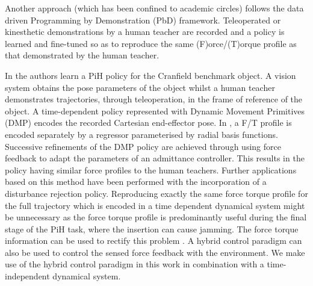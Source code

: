

Another approach (which has been confined to academic circles) follows the data driven 
Programming by Demonstration (PbD) framework. Teleoperated or kinesthetic demonstrations by a human teacher 
are recorded and a policy is learned and fine-tuned so as to reproduce the same (F)orce/(T)orque profile as 
that demonstrated by the human teacher. 

In \cite{fast_peg_pbd_icmc_2014} the authors learn a PiH policy for the Cranfield benchmark object.
A vision system obtains the pose parameters of the object whilst a human teacher  
demonstrates trajectories, through teleoperation, in the frame of reference of the object. 
A time-dependent policy represented with Dynamic Movement Primitives (DMP) \cite{Schaal04learningmovement} 
encodes the recorded Cartesian end-effector pose. In \cite{trans_workpiece_icra_2013}, a F/T profile 
is encoded separately by a regressor parameterised by radial basis functions. Successive refinements of the DMP policy are achieved through 
using force feedback to adapt the parameters of an admittance controller. This results in the policy having
similar force profiles to the human teachers. Further applications based on this method have been 
performed \cite{sol_pdg_pbd_2014} with the incorporation of a disturbance rejection policy. Reproducing exactly the same force torque profile for the full trajectory 
which is encoded in a time dependent dynamical system might be unnecessary as the force torque profile is 
predominantly useful during the final stage of the PiH task, where the insertion can cause jamming. 
The force torque information can be used to rectify this problem \cite[Chap. 5]{Kronander2015}. A 
hybrid control paradigm \cite{hybrid_1992} can also be used to control the sensed force feedback with the environment.
We make use of the hybrid control paradigm in this work in combination with a time-independent dynamical system.

